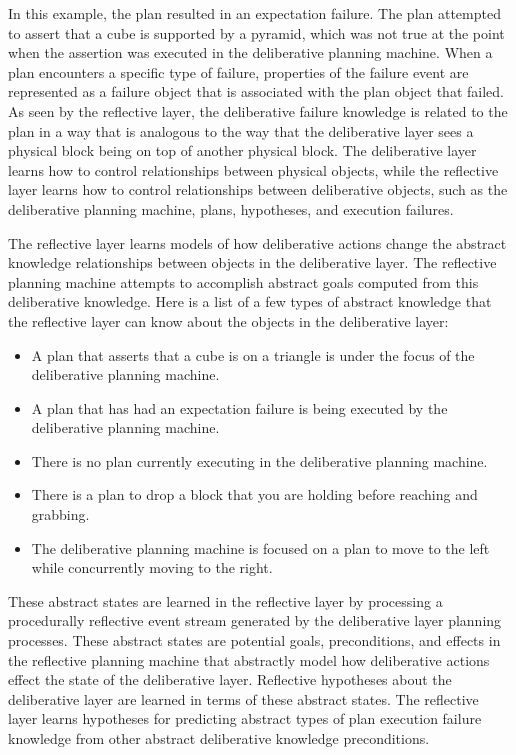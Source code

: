 In this example, the plan resulted in an expectation failure.  The
plan attempted to assert that a cube is supported by a pyramid, which
was not true at the point when the assertion was executed in the
deliberative planning machine.  When a plan encounters a specific type
of failure, properties of the failure event are represented as a
failure object that is associated with the plan object that failed.
As seen by the reflective layer, the deliberative failure knowledge is
related to the plan in a way that is analogous to the way that the
deliberative layer sees a physical block being on top of another
physical block.  The deliberative layer learns how to control
relationships between physical objects, while the reflective layer
learns how to control relationships between deliberative objects, such
as the deliberative planning machine, plans, hypotheses, and execution
failures.

The reflective layer learns models of how deliberative actions change
the abstract knowledge relationships between objects in the
deliberative layer.  The reflective planning machine attempts to
accomplish abstract goals computed from this deliberative knowledge.
Here is a list of a few types of abstract knowledge that the
reflective layer can know about the objects in the deliberative layer:
\begin{itemize}
\item A plan that asserts that a cube is on a triangle is under the
  focus of the deliberative planning machine.
\item A plan that has had an expectation failure is being executed by
  the deliberative planning machine.
\item There is no plan currently executing in the deliberative
  planning machine.
\item There is a plan to drop a block that you are holding before
  reaching and grabbing.
\item The deliberative planning machine is focused on a plan to move
  to the left while concurrently moving to the right.
\end{itemize}
These abstract states are learned in the reflective layer by
processing a procedurally reflective event stream generated by the
deliberative layer planning processes.  These abstract states are
potential goals, preconditions, and effects in the reflective planning
machine that abstractly model how deliberative actions effect the
state of the deliberative layer.  Reflective hypotheses about the
deliberative layer are learned in terms of these abstract states.  The
reflective layer learns hypotheses for predicting abstract types of
plan execution failure knowledge from other abstract deliberative
knowledge preconditions.

